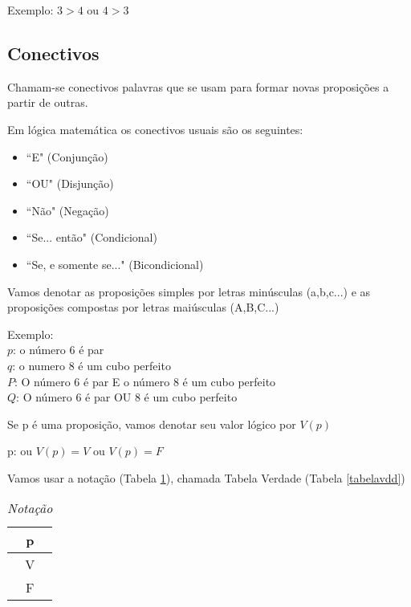 Exemplo: $3>4$ ou $4>3$

\subsection{Conectivos}

\begin{definicao}[Conectivos]Chamam-se conectivos palavras que se usam para formar novas proposi{\c c}{\~o}es a partir de outras.\end{definicao}

Em l{\'o}gica matem{\'a}tica os conectivos usuais s{\~a}o os seguintes:
\begin{itemize}
\item ``E" (Conjun{\c c}{\~a}o)
\item ``OU" (Disjun{\c c}{\~a}o)
\item ``N{\~a}o" (Nega{\c c}{\~a}o)
\item ``Se... ent{\~a}o" (Condicional)
\item ``Se, e somente se..." (Bicondicional)
\end{itemize} 

Vamos denotar as proposi{\c c}{\~o}es simples por letras min{\'u}sculas (a,b,c...) e as proposi{\c c}{\~o}es compostas por letras mai{\'u}sculas (A,B,C...)

Exemplo:\\
\textbf{$p$}: o n{\'u}mero 6 {\'e} par\\
\textbf{$q$}: o numero 8 {\'e} um cubo perfeito\\
\textbf{$P$}: O n{\'u}mero 6 {\'e} par E o n{\'u}mero 8 {\'e} um cubo perfeito\\
\textbf{$Q$}: O n{\'u}mero 6 {\'e} par OU 8 {\'e} um cubo perfeito

Se p {\'e} uma proposi{\c c}{\~a}o, vamos denotar seu valor l{\'o}gico por $V(p)$
\begin{center}
p: ou $V(p)=V$ ou $V(p)=F$
\end{center}

Vamos usar a nota{\c c}{\~a}o (Tabela \ref{notacao}), chamada Tabela Verdade (Tabela \ref{tabelavdd})
\begin{table}[h]
   \centering 
   \setlength{\arrayrulewidth}{0,5\arrayrulewidth}
   
   \caption{\it Nota{\c c}{\~a}o}
   \begin{tabular}{|c|} 
      \hline
      p \\
      \hline
      V \\
      \hline
      F \\
      \hline
   \end{tabular}
\label{notacao}
\end{table}


